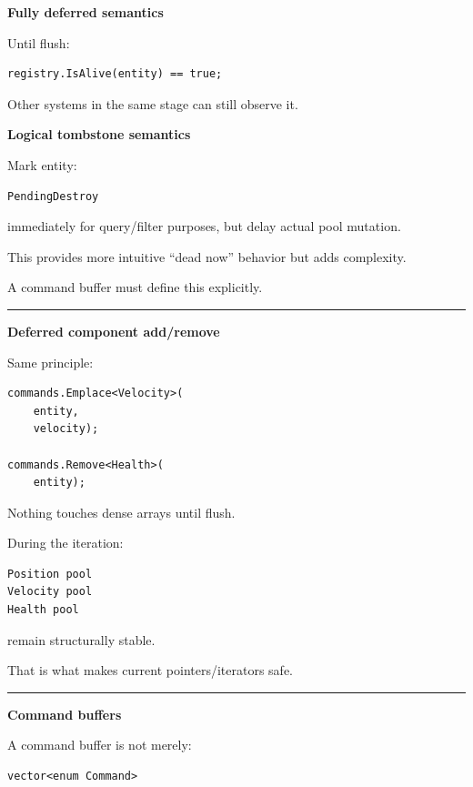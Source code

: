 \textbf{Fully deferred semantics}

Until flush:

\begin{verbatim}
registry.IsAlive(entity) == true;
\end{verbatim}

Other systems in the same stage can still observe it.

\textbf{Logical tombstone semantics}

Mark entity:

\begin{verbatim}
PendingDestroy
\end{verbatim}

immediately for query/filter purposes, but delay actual pool mutation.

This provides more intuitive ``dead now'' behavior but adds complexity.

A command buffer must define this explicitly.

\begin{center}\rule{0.5\linewidth}{0.5pt}\end{center}

\textbf{Deferred component add/remove}

Same principle:

\begin{verbatim}
commands.Emplace<Velocity>(
    entity,
    velocity);

commands.Remove<Health>(
    entity);
\end{verbatim}

Nothing touches dense arrays until flush.

During the iteration:

\begin{verbatim}
Position pool
Velocity pool
Health pool
\end{verbatim}

remain structurally stable.

That is what makes current pointers/iterators safe.

\begin{center}\rule{0.5\linewidth}{0.5pt}\end{center}

\textbf{Command buffers}

A command buffer is not merely:

\begin{verbatim}
vector<enum Command>
\end{verbatim}

